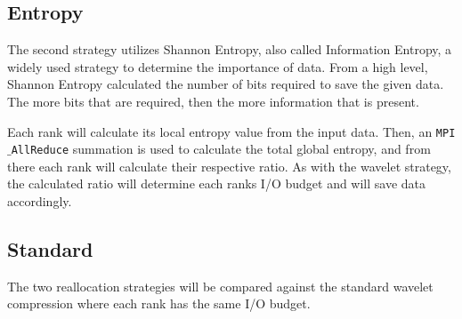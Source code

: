 \subsection{Entropy}
The second strategy utilizes Shannon Entropy, also called Information Entropy, a widely used strategy to determine the importance of data. 
%
From a high level, Shannon Entropy calculated the number of bits required to save the given data. 
%
The more bits that are required, then the more information that is present. 
%
%
%
%
%
%

Each rank will calculate its local entropy value from the input data. 
%
Then, an \texttt{MPI$\_$AllReduce} summation is used to calculate the total global entropy, and from there each rank will calculate their respective ratio. 
%
As with the wavelet strategy, the calculated ratio will determine each ranks I/O budget and will save data accordingly.  

\vspace{-1.3em}
\subsection{Standard}
The two reallocation strategies will be compared against the standard wavelet compression where each rank has the same I/O budget. 

